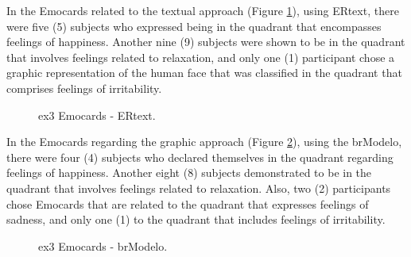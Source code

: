 In the Emocards related to the textual approach (Figure \ref{fig:Emocards4_alt}), using ERtext, there were five (5) subjects who expressed being in the quadrant that encompasses feelings of happiness.
Another nine (9) subjects were shown to be in the quadrant that involves feelings related to relaxation, and only one (1) participant chose a graphic representation of the human face that was classified in the quadrant that comprises feelings of irritability.

\begin{figure}[!htb]
    \centering
    \caption{\ac{ex3} Emocards - ERtext.}
    \label{fig:Emocards4_alt}
    
\end{figure}

In the Emocards regarding the graphic approach (Figure \ref{fig:Emocards3_alt}), using the brModelo, there were four (4) subjects who declared themselves in the quadrant regarding feelings of happiness.
Another eight (8) subjects demonstrated to be in the quadrant that involves feelings related to relaxation.
Also, two (2) participants chose Emocards that are related to the quadrant that expresses feelings of sadness, and only one (1) to the quadrant that includes feelings of irritability.

\begin{figure}[!htb]
    \centering
    \caption{\ac{ex3} Emocards - brModelo.}
    \label{fig:Emocards3_alt}
    
\end{figure}

